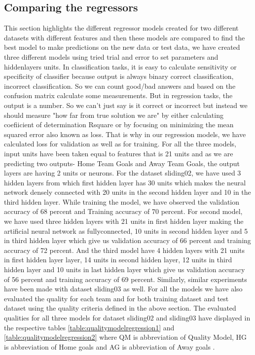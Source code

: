 \subsection{Comparing the regressors}
This section highlights the different regressor models created for two different datasets with different features and then these models are compared to find the best model to make predictions on the new data or test data, we have created three different models using tried trial and error to set parameters and hiddenlayers units.\newline 
In classification tasks, it is easy to calculate sensitivity or specificity of classifier because output is always binary {correct classification, incorrect classification}. So we can count good/bad answers and based on the confusion matrix calculate some measurements. But in regression tasks, the output is a number. So we can't just say is it correct or incorrect but instead we should measure "how far from true solution we are" by either calculating coefiicient of determination Rsquare or by focusing on minimizing the mean squared error also known as loss. That is why in our regression models, we have calculated loss for validation as well as for training.
For all the three models, input units have been taken equal to features that is 21 units and as we are predicting two outputs- Home Team Goals and Away Team Goals, the output layers are having 2 units or neurons. For the dataset sliding02, we have used 3 hidden layers from which first hidden layer has 30 units which makes the neural network densely connected with 20 units in the second hidden layer and 10 in the third hidden layer. While training the model, we have observed the validation accuracy of 68 percent and Training accuracy of 70 percent. For second model, we have used three hidden layers with 21 units in first hidden layer making the artificial neural network as fullyconnected, 10 units in second hidden layer and 5 in third hidden layer which give us validation accuracy of 66 percent and training accuracy of 72 percent. And the third model have 4 hidden layers with 21 units in first hidden layer layer, 14 units in second hidden layer, 12 units in third hidden layer and 10 units in last hidden layer which give us validation accuracy of 56 percent and training accuracy of 69 percent.\newline
Similarly, similar experiments have been made with dataset sliding03 as well. For all the models we have also evaluated the quality for each team and for both training dataset and test dataset using the quality criteria defined in the above section. The evaluated qualities for all three models for dataset sliding02 and sliding03 have displayed in the respective tables \autoref{table:qualitymodelregression1} and \autoref{table:qualitymodelregression2} where QM is abbreviation of Quality Model, HG is abbreviation of Home goals and AG is abbreviation of Away goals
.\newline

